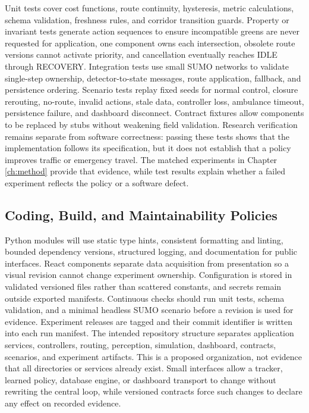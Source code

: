 Unit tests cover cost functions, route continuity, hysteresis, metric calculations, schema validation, freshness rules, and corridor transition guards. Property or invariant tests generate action sequences to ensure incompatible greens are never requested for application, one component owns each intersection, obsolete route versions cannot activate priority, and cancellation eventually reaches IDLE through RECOVERY. Integration tests use small SUMO networks to validate single-step ownership, detector-to-state messages, route application, fallback, and persistence ordering. Scenario tests replay fixed seeds for normal control, closure rerouting, no-route, invalid actions, stale data, controller loss, ambulance timeout, persistence failure, and dashboard disconnect. Contract fixtures allow components to be replaced by stubs without weakening field validation. Research verification remains separate from software correctness: passing these tests shows that the implementation follows its specification, but it does not establish that a policy improves traffic or emergency travel. The matched experiments in Chapter \ref{ch:method} provide that evidence, while test results explain whether a failed experiment reflects the policy or a software defect.

\subsection{Coding, Build, and Maintainability Policies}

Python modules will use static type hints, consistent formatting and linting, bounded dependency versions, structured logging, and documentation for public interfaces. React components separate data acquisition from presentation so a visual revision cannot change experiment ownership. Configuration is stored in validated versioned files rather than scattered constants, and secrets remain outside exported manifests. Continuous checks should run unit tests, schema validation, and a minimal headless SUMO scenario before a revision is used for evidence. Experiment releases are tagged and their commit identifier is written into each run manifest. The intended repository structure separates application services, controllers, routing, perception, simulation, dashboard, contracts, scenarios, and experiment artifacts. This is a proposed organization, not evidence that all directories or services already exist. Small interfaces allow a tracker, learned policy, database engine, or dashboard transport to change without rewriting the central loop, while versioned contracts force such changes to declare any effect on recorded evidence.

